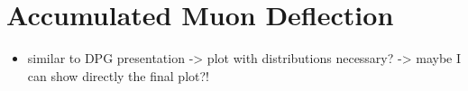 \section{Accumulated Muon Deflection}\label{sec:accum_defl}
\begin{itemize}
    \item similar to DPG presentation -> plot with distributions necessary? -> 
        maybe I can show directly the final plot?!
\end{itemize}